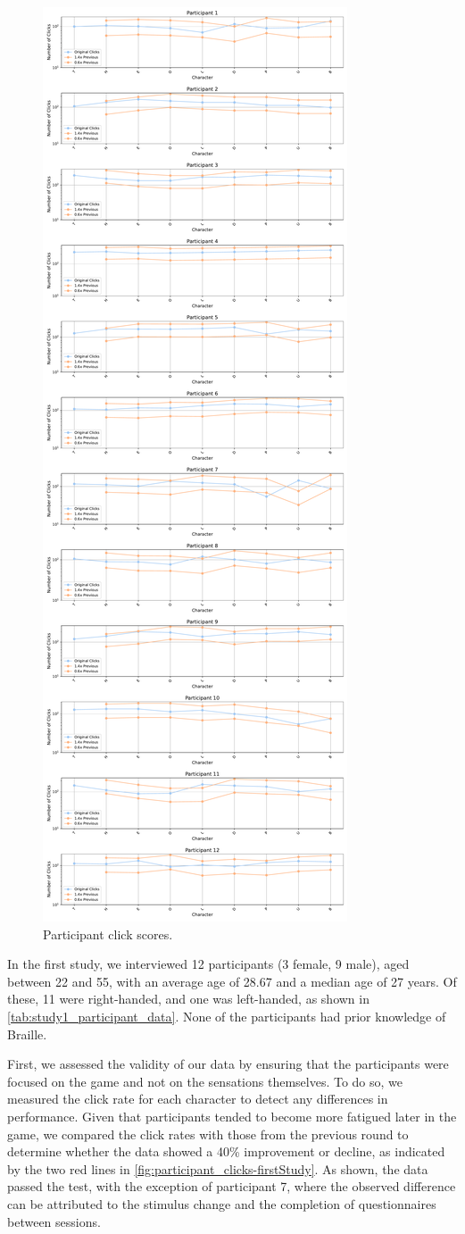 \begin{figure}
    \centering
    \includegraphics[width=0.5\linewidth]{src/pictures/Study1Data_questionnaire/participantPlots_study1.pdf}
    \caption{Participant click scores.}
    \label{fig:participant_clicks-firstStudy}
\end{figure}

In the first study, we interviewed 12 participants (3 female, 9 male), aged between 22 and 55, with an average age of 28.67 and a median age of 27 years. Of these, 11 were right-handed, and one was left-handed, as shown in \autoref{tab:study1_participant_data}. None of the participants had prior knowledge of Braille.

First, we assessed the validity of our data by ensuring that the participants were focused on the game and not on the sensations themselves. To do so, we measured the click rate for each character to detect any differences in performance. Given that participants tended to become more fatigued later in the game, we compared the click rates with those from the previous round to determine whether the data showed a 40\% improvement or decline, as indicated by the two red lines in \autoref{fig:participant_clicks-firstStudy}. As shown, the data passed the test, with the exception of participant 7, where the observed difference can be attributed to the stimulus change and the completion of questionnaires between sessions.

